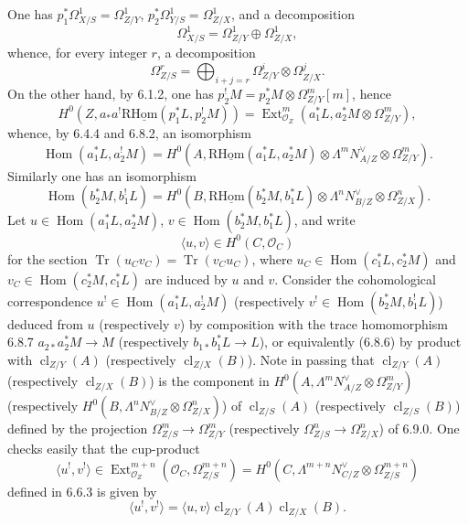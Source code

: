 \documentclass[11pt]{article}
\DeclareMathOperator{\Hom}{Hom}
\DeclareMathOperator{\Ext}{Ext}
\providecommand{\cl}{\operatorname{cl}}
\providecommand{\OO}{\mathcal{O}}
\providecommand{\Hom}{\operatorname{Hom}}
\providecommand{\cl}{\operatorname{cl}}
\providecommand{\Hom}{\operatorname{Hom}}
\providecommand{\cl}{\operatorname{cl}}
\begin{document}
One has $p_1^*\Omega^1_{X/S}=\Omega^1_{Z/Y}$, $p_2^*\Omega^1_{Y/S}=\Omega^1_{Z/X}$, and a decomposition
\[
\Omega^1_{X/S}=\Omega^1_{Z/Y}\oplus\Omega^1_{Z/X},
\]
whence, for every integer $r$, a decomposition
\begin{equation}
\tag{6.9.0}
\Omega^r_{Z/S}=\bigoplus_{i+j=r}\Omega^i_{Z/Y}\otimes\Omega^j_{Z/X}.
\end{equation}
On the other hand, by 6.1.2, one has $p_2^!M=p_2^*M\otimes\Omega^m_{Z/Y}[m]$, hence
\[
H^0(Z,a_*a^!\mathrm{R}\underline{\mathrm{Hom}}(p_1^*L,p_2^!M))=\Ext^m_{\OO_Z}(a_1^*L,a_2^*M\otimes\Omega^m_{Z/Y}),
\]
whence, by 6.4.4 and 6.8.2, an isomorphism
\begin{equation}
\tag{6.9.1}
\Hom(a_1^*L,a_2^!M)=H^0(A,\mathrm{R}\underline{\mathrm{Hom}}(a_1^*L,a_2^*M)\otimes\Lambda^m N_{A/Z}^{\vee}\otimes\Omega^m_{Z/Y}).
\end{equation}
Similarly one has an isomorphism
\begin{equation}
\tag{6.9.2}
\Hom(b_2^*M,b_1^!L)=H^0(B,\mathrm{R}\underline{\mathrm{Hom}}(b_2^*M,b_1^*L)\otimes\Lambda^n N_{B/Z}^{\vee}\otimes\Omega^n_{Z/X}).
\end{equation}
Let $u\in\Hom(a_1^*L,a_2^*M)$, $v\in\Hom(b_2^*M,b_1^*L)$, and write
\begin{equation}
\tag{6.9.3}
\langle u,v\rangle\in H^0(C,\OO_C)
\end{equation}
for the section $\operatorname{Tr}(u_Cv_C)=\operatorname{Tr}(v_Cu_C)$, where $u_C\in\Hom(c_1^*L,c_2^*M)$ and $v_C\in\Hom(c_2^*M,c_1^*L)$ are induced by $u$ and $v$. Consider the cohomological correspondence $u^!\in\Hom(a_1^*L,a_2^!M)$ (respectively $v^!\in\Hom(b_2^*M,b_1^!L)$) deduced from $u$ (respectively $v$) by composition with the trace homomorphism 6.8.7 $a_{2*}a_2^*M\to M$ (respectively $b_{1*}b_1^*L\to L$), or equivalently (6.8.6) by product with $\cl_{Z/Y}(A)$ (respectively $\cl_{Z/X}(B)$). Note in passing that $\cl_{Z/Y}(A)$ (respectively $\cl_{Z/X}(B)$) is the component in $H^0(A,\Lambda^mN_{A/Z}^{\vee}\otimes\Omega^m_{Z/Y})$ (respectively $H^0(B,\Lambda^nN_{B/Z}^{\vee}\otimes\Omega^n_{Z/X})$) of $\cl_{Z/S}(A)$ (respectively $\cl_{Z/S}(B)$) defined by the projection $\Omega^m_{Z/S}\to\Omega^m_{Z/Y}$ (respectively $\Omega^n_{Z/S}\to\Omega^n_{Z/X}$) of 6.9.0. One checks easily that the cup-product
\[
\langle u^!,v^!\rangle\in\Ext^{m+n}_{\OO_Z}(\OO_C,\Omega^{m+n}_{Z/S})=H^0(C,\Lambda^{m+n}N_{C/Z}^{\vee}\otimes\Omega^{m+n}_{Z/S})
\]
defined in 6.6.3 is given by
\begin{equation}
\tag{6.9.4}
\langle u^!,v^!\rangle=\langle u,v\rangle\cl_{Z/Y}(A)\cl_{Z/X}(B).
\end{equation}
\end{document}
